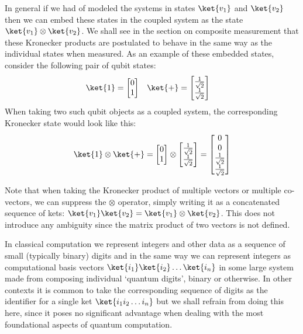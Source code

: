 In general if we had of modeled the systems in states $\ket{v_1}$ and $\ket{v_2}$ then we can embed these states in the coupled system as the state $\ket{v_1} \otimes \ket{v_2}$. We shall see in the section on composite measurement that these Kronecker products are postulated to behave in the same way as the individual states when measured. As an example of these embedded states, consider the following pair of qubit states:
\begin{align*}
\ket{1} = \left[\begin{matrix}0\\1\end{matrix}\right]
&&&
\ket{+} = \left[\begin{matrix}\frac{1}{\sqrt{2}}\\\frac{1}{\sqrt{2}}\end{matrix}\right]
\end{align*}
When taking two such qubit objects as a coupled system, the corresponding Kronecker state would look like this:
\[
\ket{1}\otimes \ket{+} = \left[\begin{matrix}0\\1\end{matrix}\right]
\otimes
\left[\begin{matrix}\frac{1}{\sqrt{2}}\\\frac{1}{\sqrt{2}}\end{matrix}\right]
=
\left[\begin{matrix}0\\0\\\frac{1}{\sqrt{2}}\\\frac{1}{\sqrt{2}}\end{matrix}\right]
\]

Note that when taking the Kronecker product of multiple vectors or multiple co-vectors, we can suppress the $\otimes$ operator, simply writing it as a concatenated sequence of kets: $\ket{v_1}\ket{v_2} = \ket{v_1}\otimes\ket{v_2}$. This does not introduce any ambiguity since the matrix product of two vectors is not defined.

In classical computation we represent integers and other data as a sequence of small (typically binary) digits and in the same way we can represent integers as computational basis vectors $\ket{i_1}\ket{i_2}\dots\ket{i_n}$ in some large system made from composing individual `quantum digits', binary or otherwise. In other contexts it is common to take the corresponding sequence of digits as the identifier for a single ket $\ket{i_1i_2\dots i_n}$ but we shall refrain from doing this here, since it poses no significant advantage when dealing with the most foundational aspects of quantum computation.

